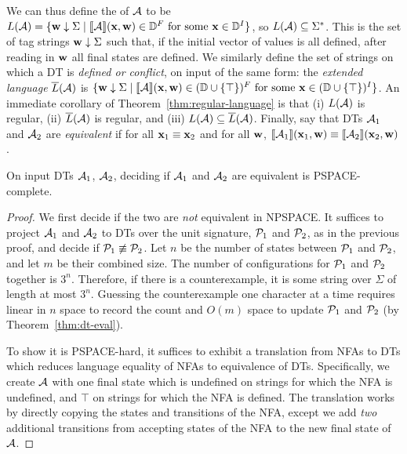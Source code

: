 We can thus define the  of $\mathcal{A}$ to be $L(\mathcal{A}) = \{\textbf{w} \downarrow \Sigma \mid \llbracket \mathcal{A} \rrbracket(\textbf{x},\textbf{w}) \in \mathbb{D}^F \text{ for some } \textbf{x} \in \mathbb{D}^I\}$, so $L(\mathcal{A}) \subseteq \Sigma^*$. This is the set of tag strings $\textbf{w} \downarrow \Sigma$ such that, if the initial vector of values is all defined, after reading in $\textbf{w}$ all final states are defined.
We similarly define the set of strings on which a DT is \emph{defined or conflict}, on input of the same form: the \emph{extended language} $\overline{L}(\mathcal{A})$ is
$\{\textbf{w} \downarrow \Sigma \mid \llbracket \mathcal{A} \rrbracket(\textbf{x},\textbf{w}) \in (\mathbb{D} \cup \{\top\})^F \text{ for some } \textbf{x} \in (\mathbb{D} \cup \{\top\})^I\}$.
An immediate corollary of Theorem~\ref{thm:regular-language} is that
(i) $L(\mathcal{A})$ is regular, (ii) $\overline{L}(\mathcal{A})$ is regular, and (iii) $L(\mathcal{A}) \subseteq \overline{L}(\mathcal{A})$.
Finally, say that DTs $\mathcal{A}_1$ and $\mathcal{A}_2$ are \emph{equivalent} if for all $\textbf{x}_1 \equiv \textbf{x}_2$ and
for all $\textbf{w}$, $\llbracket \mathcal{A}_1 \rrbracket(\textbf{x}_1,\textbf{w}) \equiv \llbracket \mathcal{A}_2 \rrbracket(\textbf{x}_2,\textbf{w})$.

\begin{theorem}
\label{thm:equivalence-pspace-complete}
On input DTs $\mathcal{A}_1$, $\mathcal{A}_2$,
deciding if $\mathcal{A}_1$ and $\mathcal{A}_2$ are equivalent is PSPACE-complete.
\end{theorem}
\begin{proof}
We first decide if the two are \emph{not} equivalent in NPSPACE.
It suffices to project $\mathcal{A}_1$ and $\mathcal{A}_2$ to DTs
over the unit signature, $\mathcal{P}_1$ and $\mathcal{P}_2$, as in the previous proof,
and decide if $\mathcal{P}_1 \not\equiv \mathcal{P}_2$.
Let $n$ be the number of states between $\mathcal{P}_1$ and $\mathcal{P}_2$,
and let $m$ be their combined size.
The number of configurations for $\mathcal{P}_1$ and $\mathcal{P}_2$ together is $3^n$.
Therefore, if there is a counterexample, it is some string over $\Sigma$ of length at most $3^n$.
Guessing the counterexample one character at a time
requires linear in $n$ space to record the count and $O(m)$ space to update
$\mathcal{P}_1$ and $\mathcal{P}_2$ (by Theorem~\ref{thm:dt-eval}).

To show it is PSPACE-hard,
it suffices to exhibit a translation from NFAs to
DTs which reduces
language equality of NFAs to equivalence of DTs.
Specifically, we create $\mathcal{A}$ with one final state
which is undefined on strings for which the NFA is undefined, and $\top$
on strings for which the NFA is defined.
The translation works by directly copying the states and transitions of the NFA, except we add \emph{two} additional transitions from accepting states of the NFA to the new final state of $\mathcal{A}$.
\end{proof}

